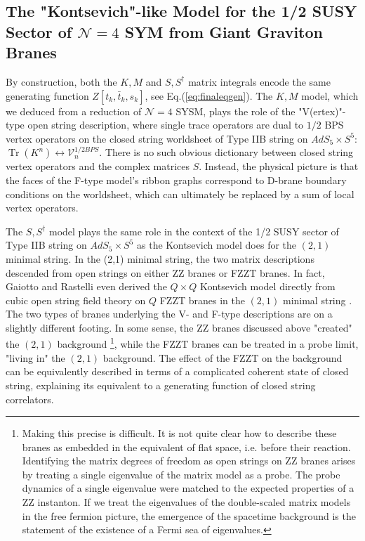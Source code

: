 \documentclass[english]{article}
\DeclareMathOperator{\Tr}{Tr}
\renewcommand{\>}{\rangle}
\newcommand{\<}{\langle}
\renewcommand{\(}{\left(}
\renewcommand{\)}{\right)}
\begin{document}
\subsection{The "Kontsevich"-like Model for the 1/2 SUSY Sector of $\mathcal{N}=4$ SYM from Giant Graviton Branes} \label{sec:OCOGiants}

By construction, both the $K,M$ and $S,S^\dagger$ matrix integrals encode the same generating function $Z[t_{k},\bar{t}_{k},s_{k}]$, see Eq.(\ref{eq:finaleqgen}). The $K,M$ model, which we deduced from a reduction of $\mathcal{N}=4$ SYSM, plays the role of the "V(ertex)"-type open string description, where single trace operators are dual to $1/2$ BPS vertex operators on the closed string worldsheet of Type IIB string on $AdS_{5} \times S^{5}$: $\Tr(K^n) \leftrightarrow \mathcal{V}^{1/2 BPS}_{n} $. There is no such obvious dictionary between closed string vertex operators and the complex matrices $S$. Instead, the physical picture is that the faces of the F-type model's ribbon graphs correspond to D-brane boundary conditions on the worldsheet, which can ultimately be replaced by a sum of local vertex operators. 

The $S, S^{\dagger}$ model plays the same role in the context of the 1/2 SUSY sector of Type IIB string on $AdS_{5} \times S^{5}$ as the Kontsevich model does for the $(2,1)$ minimal string. In the (2,1) minimal string, the two matrix descriptions descended from open strings on either ZZ branes or FZZT branes. In fact, Gaiotto and Rastelli even derived the  $Q \times Q $ Kontsevich model directly from cubic open string field theory on $Q$ FZZT branes in the  $(2,1)$ minimal string \cite{Gaiotto:2003yb}. The two types of branes underlying the V- and F-type descriptions are on a slightly different footing. In some sense, the ZZ branes discussed above "created" the $(2,1)$ background \footnote{Making this precise is difficult. It is not quite clear how to describe these branes as embedded in the equivalent of flat space, i.e. before their reaction. Identifying the matrix degrees of freedom as open strings on ZZ branes arises by treating a single eigenvalue of the matrix model as a probe. The probe dynamics of a single eigenvalue were matched to the expected properties of a ZZ instanton. If we treat the eigenvalues of the double-scaled matrix models in the free fermion picture, the emergence of the spacetime background is the statement of the existence of a Fermi sea of eigenvalues.\cite{Takayanagi:2004ge, Takayanagi:2005tq}}, while the FZZT branes can be treated in a probe limit, "living in" the $(2,1)$ background. The effect of the FZZT on the background can be equivalently described in terms of a complicated coherent state of closed string, explaining its equivalent to a generating function of closed string correlators.
\end{document}
